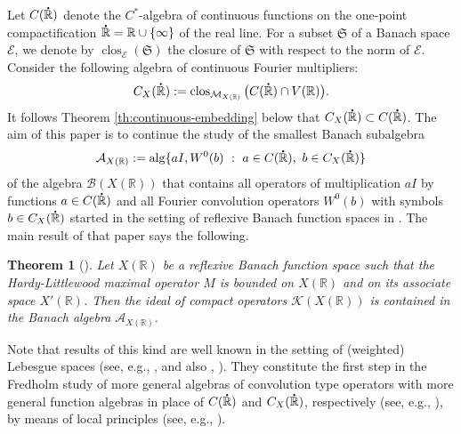 \documentclass[reqno]{amsproc}
\newcommand{\cA}{\mathcal{A}}
\newcommand{\cB}{\mathcal{B}}
\newcommand{\cK}{\mathcal{K}}
\newcommand{\cM}{\mathcal{M}}
\newcommand{\dR}{{\bf\dot{\R}}}
\newcommand{\R}{\mathbb{R}}
\newtheorem{theorem}{Theorem}[section]
\theoremstyle{definition}
\theoremstyle{remark}
\numberwithin{equation}{section}
\begin{document}
Let $C(\dR)$ denote the $C^*$-algebra of continuous functions on the one-point 
compactification $\dR=\R\cup\{\infty\}$ of the real line. For a subset 
$\mathfrak{S}$ of a Banach space $\mathcal{E}$, we denote by
$\operatorname{clos}_\mathcal{E}(\mathfrak{S})$ the closure of $\mathfrak{S}$
with respect to the norm of $\mathcal{E}$. Consider the following algebra of 
continuous Fourier multipliers:
\begin{equation}\label{eq:algebra-CX}
C_{X}(\dR):=\operatorname{clos}_{\cM_{X(\R)}}
\big(C(\dR)\cap V(\R)\big).
\end{equation}
It follows Theorem \ref{th:continuous-embedding} below that 
$C_X(\dR)\subset C(\dR)$. 
The aim of this paper is to continue the study of the smallest Banach subalgebra
\[
\cA_{X(\R)}
:=
\operatorname{alg}\{aI,W^0(b)\ :\ a\in C(\dR),\ b\in C_X(\dR)\}
\]
of the algebra $\cB(X(\R))$ that contains all operators of multiplication $aI$ 
by functions $a\in C(\dR)$ and all Fourier convolution operators $W^0(b)$ with 
symbols $b\in C_X(\dR)$ started in the setting of reflexive Banach function
spaces in \cite{FKK19}. The main result of that paper says the following.
\begin{theorem}[{\cite[Theorem~1.1]{FKK19}}]
\label{th:FKK}
Let $X(\R)$ be a reflexive Banach function space such that the Hardy-Littlewood 
maximal operator $M$ is bounded on $X(\R)$ and on its associate space 
$X'(\R)$. Then the ideal of compact operators $\cK(X(\R))$ is contained in the 
Banach algebra $\cA_{X(\R)}$.
\end{theorem}
Note that results of this kind are well known in the setting of (weighted)
Lebesgue spaces (see, e.g., \cite[Lemma~6.1]{KILH13a}, \cite[Theorem~5.2.1 and 
Proposition~5.8.1]{RSS11} and also \cite[Lemma~8.23]{BK97}, 
\cite[Theorem~4.1.5]{RSS11}). They constitute the first step in the Fredholm 
study of more general algebras of convolution type operators with more 
general function algebras in place of $C(\dR)$ and $C_X(\dR)$, respectively 
(see, e.g., \cite{KILH12,KILH13a,KILH13b}), by means of local principles 
(see, e.g., \cite[Sections~1.30--1.35]{BS06}).
\end{document}
